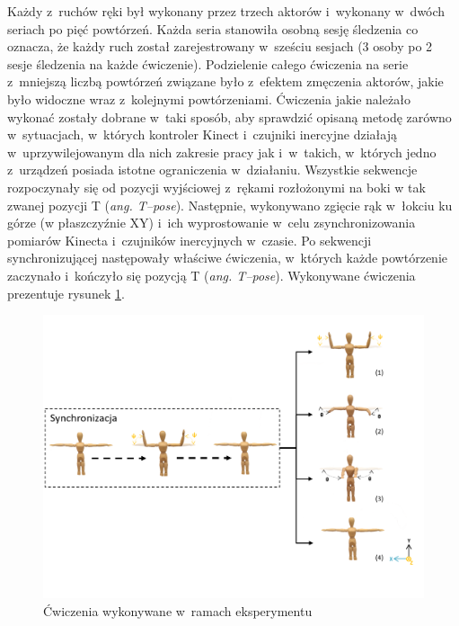 Każdy z~ruchów ręki był wykonany przez trzech aktorów i~wykonany w~dwóch seriach po pięć powtórzeń. Każda seria stanowiła osobną sesję śledzenia co oznacza, że każdy ruch został zarejestrowany w~sześciu sesjach (3 osoby po 2 sesje śledzenia na każde ćwiczenie). Podzielenie całego ćwiczenia na serie z~mniejszą liczbą powtórzeń związane było z~efektem zmęczenia aktorów, jakie było widoczne wraz z~kolejnymi powtórzeniami. Ćwiczenia jakie należało wykonać zostały dobrane w~taki sposób, aby sprawdzić opisaną metodę zarówno w~sytuacjach, w~których kontroler Kinect i~czujniki inercyjne działają w~uprzywilejowanym dla nich zakresie pracy jak i~w~takich, w~których jedno z~urządzeń posiada istotne ograniczenia w~działaniu. Wszystkie sekwencje rozpoczynały się od pozycji wyjściowej z~rękami rozłożonymi na boki w tak zwanej pozycji T (\emph{ang. T--pose}). Następnie, wykonywano zgięcie rąk w~łokciu ku górze (w płaszczyźnie XY) i~ich wyprostowanie w~celu zsynchronizowania pomiarów Kinecta i~czujników inercyjnych w~czasie. Po sekwencji synchronizującej następowały właściwe ćwiczenia, w~których każde powtórzenie zaczynało i~kończyło się pozycją T (\emph{ang. T--pose}). Wykonywane ćwiczenia prezentuje rysunek \ref{fig:experiments:poses}.
				
\begin{savenotes}
	\begin{figure}[!htb]
		\centering
		\includegraphics[width=\textwidth]{images/poses.png}
		\caption{Ćwiczenia wykonywane w~ramach eksperymentu}
		\label{fig:experiments:poses}
	\end{figure}
\end{savenotes}
						
